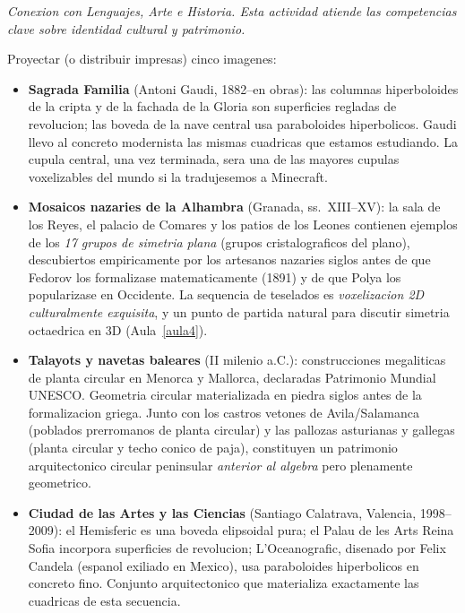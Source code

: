\documentclass[12pt,a4paper]{scrartcl}
\newcommand{\acc}[1]{\textcolor{accent}{\textbf{#1}}}
\newcommand{\tempo}[1]{\textnormal{\footnotesize\color{bg!90!white}\textsf{#1}}}
\begin{document}
\begin{actividad}[3.4 --- Dialogo con el patrimonio visual espanol \quad\tempo{10 min}]\label{at:34}
\emph{Conexion con Lenguajes, Arte e Historia. Esta actividad atiende las competencias clave sobre identidad cultural y patrimonio.}

Proyectar (o distribuir impresas) cinco imagenes:

\begin{itemize}[leftmargin=1.3em,itemsep=0.2em,topsep=0.3em,nosep]
  \item \acc{Sagrada Familia} (Antoni Gaudi, 1882--en obras): las columnas hiperboloides de la cripta y de la fachada de la Gloria son superficies regladas de revolucion; las boveda de la nave central usa paraboloides hiperbolicos. Gaudi llevo al concreto modernista las mismas cuadricas que estamos estudiando. La cupula central, una vez terminada, sera una de las mayores cupulas voxelizables del mundo si la tradujesemos a Minecraft.

  \item \acc{Mosaicos nazaries de la Alhambra} (Granada, ss.\ XIII--XV): la sala de los Reyes, el palacio de Comares y los patios de los Leones contienen ejemplos de los \emph{17 grupos de simetria plana} (grupos cristalograficos del plano), descubiertos empiricamente por los artesanos nazaries siglos antes de que Fedorov los formalizase matematicamente (1891) y de que Polya los popularizase en Occidente. La sequencia de teselados es \emph{voxelizacion 2D culturalmente exquisita}, y un punto de partida natural para discutir simetria octaedrica en 3D (Aula~\ref{aula4}).

  \item \acc{Talayots y navetas baleares} (II milenio a.C.): construcciones megaliticas de planta circular en Menorca y Mallorca, declaradas Patrimonio Mundial UNESCO. Geometria circular materializada en piedra siglos antes de la formalizacion griega. Junto con los castros vetones de Avila/Salamanca (poblados prerromanos de planta circular) y las pallozas asturianas y gallegas (planta circular y techo conico de paja), constituyen un patrimonio arquitectonico circular peninsular \emph{anterior al algebra} pero plenamente geometrico.

  \item \acc{Ciudad de las Artes y las Ciencias} (Santiago Calatrava, Valencia, 1998--2009): el Hemisferic es una boveda elipsoidal pura; el Palau de les Arts Reina Sofia incorpora superficies de revolucion; L'Oceanografic, disenado por Felix Candela (espanol exiliado en Mexico), usa paraboloides hiperbolicos en concreto fino. Conjunto arquitectonico que materializa exactamente las cuadricas de esta secuencia.


\end{itemize}
\end{actividad}
\end{document}
